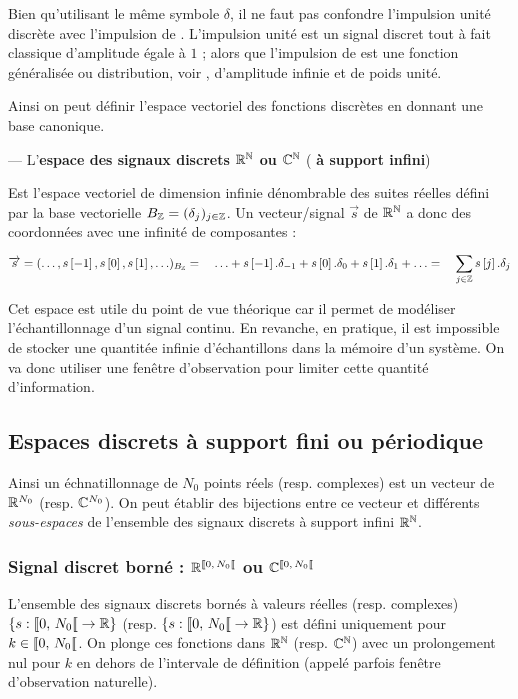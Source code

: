 \begin{remarque}
  Bien qu'utilisant le même symbole $\delta$, il ne faut pas confondre
l'impulsion unité discrète avec l'impulsion de \Dirac. L'impulsion
unité est un signal discret tout à fait classique d'amplitude égale à
$1$ ; alors que l'impulsion de \Dirac{} est une fonction généralisée ou
distribution, voir , d'amplitude infinie et de
poids unité.
\end{remarque}

Ainsi on peut définir l'espace vectoriel des fonctions discrètes en
donnant une base canonique.

\begin{definition}
  \label{def:signal_discret}
  --- L'\textbf{espace des signaux discrets $\mathbb{R}^{\mathbb{N}}$ ou $\mathbb{C}^{\mathbb{N}}$} ( \textbf{à support infini})

  Est l'espace vectoriel de
  dimension infinie dénombrable des suites réelles défini par la base
  vectorielle $B_{\mathbb{Z}}=(\delta_j)_{j\in\mathbb{Z}}$. Un vecteur/signal
  $\vec{s}$ de $\mathbb{R}^{\mathbb{N}}$ a donc des coordonnées avec une infinité de
  composantes :
  \begin{equation*}
    \overrightarrow{s}  = (\ldots,s\left[-1\right], s\left[0\right], s\left[1\right], \ldots)_{B_{\mathbb{Z}}} = \quad \ldots + s\left[-1\right].\delta_{-1} + s\left[0\right].\delta_0 + s\left[1\right].\delta_1 + \ldots =\quad \sum\limits_{j\in\mathbb{Z}}^{}{s\left[j\right].\delta_j}
  \end{equation*}

\end{definition}

Cet espace est utile du point de vue théorique car il permet de
modéliser l'échantillonnage d'un signal continu. En revanche, en
pratique, il est impossible de stocker une quantitée infinie
d'échantillons dans la mémoire d'un système. On va donc utiliser une
fenêtre d'observation pour limiter cette quantité d'information.


\subsection{Espaces discrets à support fini ou périodique}
Ainsi un échnatillonnage de $N_0$ points réels (resp. complexes) est
un vecteur de $\mathbb{R}^{N_0}$ (resp. $\mathbb{C}^{N_0}$). On peut établir des bijections
entre ce vecteur et différents \emph{sous-espaces} de l'ensemble des signaux
discrets à support infini $\mathbb{R}^{\mathbb{N}}$.



\subsubsection{Signal discret borné :  $\RNborne$ ou $\CNborne$}
L'ensemble des signaux discrets bornés à valeurs réelles (resp. complexes) $\left\{s : \SN0 \to \R \right\}$ (resp. $\left\{s : \SN0 \to \R \right\}$) est défini uniquement pour $k\in\SN0$. On plonge ces fonctions dans $\mathbb{R}^{\mathbb{N}}$ (resp. $\mathbb{C}^{\mathbb{N}}$) avec un prolongement nul pour $k$ en dehors de l'intervale de définition (appelé parfois fenêtre d'observation naturelle).

